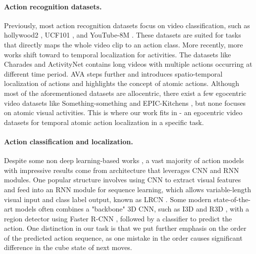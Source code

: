 \documentclass[10pt,twocolumn,letterpaper]{article}
\begin{document}
\paragraph{Action recognition datasets.} Previously, most action recognition datasets focus on video classification, such as hollywood2 \cite{hollywood2}, UCF101 \cite{ucf101}, and YouTube-8M \cite{youtube8m}. These datasets are suited for tasks that directly maps the whole video clip to an action class. More recently, more works shift toward to temporal localization for activities. The datasets like Charades \cite{charades} and ActivityNet \cite{activitynet} contains long videos 
with multiple actions occurring at different time period. AVA \cite{ava} steps further and introduces spatio-temporal localization of actions and highlights the concept of atomic actions. Although most of the aforementioned datasets are allocentric, there exist a few egocentric video datasets like Something-something \cite {sthsth} and EPIC-Kitchens \cite{epic_kitchen}, but none focuses on atomic visual activities. This is where our work fits in - an egocentric video datasets for temporal atomic action localization in a specific task.

\vspace{-2mm}

\paragraph{Action classification and localization.} Despite some non deep learning-based works \cite{sadek2012fast, stochastic}, a vast majority of action models with impressive results come from architecture that leverages CNN and RNN modules. One popular structure involves using CNN to extract visual features and feed into an RNN module for sequence learning, which allows variable-length visual input and class label output, known as LRCN \cite{lrcn}. Some modern state-of-the-art models \cite{ava, better_ava} often combines a "backbone" 3D CNN, such as I3D \cite{i3d} and R3D \cite{r3d}, with a region detector using Faster R-CNN \cite{faster_rcnn}, followed by a classifier to predict the action. One distinction in our task is that we put further emphasis on the order of the predicted action sequence, as one mistake in the order causes significant difference in the cube state of next moves.

\end{document}
